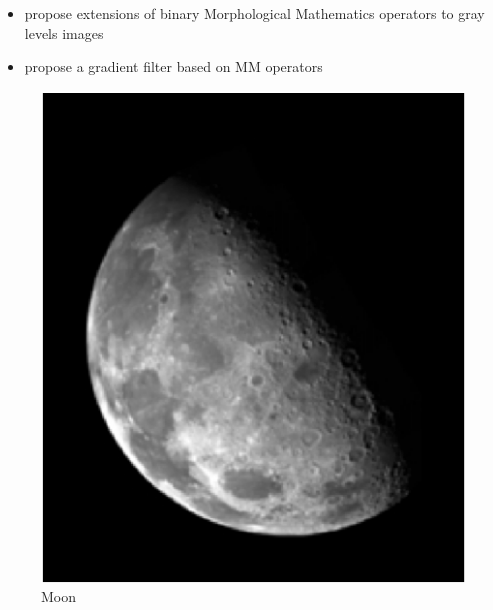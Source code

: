 \documentclass[12pt]{tdtp}
\begin{document}
\begin{itemize}
	\item propose extensions of binary Morphological Mathematics operators to gray levels images
	\item propose a gradient filter based on MM operators
\end{itemize}

\begin{figure}[h!]
	\begin{center}
		\includegraphics[scale=0.5]{images/moon.png}
		\caption{Moon}
		\label{mri}
	\end{center}
\end{figure}


\end{document}
